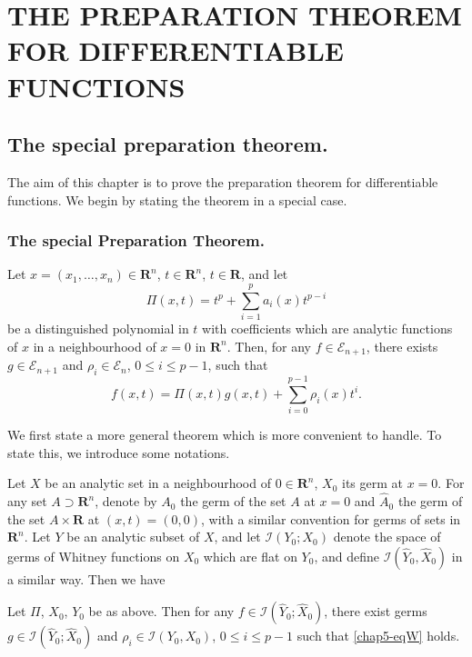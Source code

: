 \chapter{THE PREPARATION THEOREM FOR DIFFERENTIABLE FUNCTIONS}\label{chap5}
\pageoriginale

\section[The special preparation theorem]{The special preparation theorem.}\label{chap5-sec1}
The aim of this chapter is to prove the preparation theorem for differentiable functions. We begin by stating the theorem in a special case.

\subsection{The special Preparation Theorem.}\label{chap5-subsec1.1}
Let $x = (x_1, \ldots, x_n) \in \mathbf{R}^n$, $t \in \mathbf{R}^n$, $t \in \mathbf{R}$, and let
$$
\Pi (x,t) = t^p + \sum\limits^{p}_{i=1} a_i (x) t^{p-i}
$$
be a distinguished polynomial in $t$ with coefficients which are analytic functions of $x$ in a neighbourhood of $x =0$ in $\mathbf{R}^n$. Then, for any $f \in \mathscr{E}_{n+1}$, there exists $g \in \mathscr{E}_{n+1}$ and $\rho_i \in \mathscr{E}_n$, $0 \leq i \leq p -1 $, such that 
\begin{equation*}
f (x,t) = \Pi (x,t) g(x,t) + \sum\limits^{p-1}_{i=0} \rho_i (x)t^i. \tag{W}\label{chap5-eqW}
\end{equation*}

We first state a more general theorem which is more convenient to handle. To state this, we introduce some notations.

Let $X$ be an analytic set in a neighbourhood of $0\in \mathbf{R}^n$, $X_0$ its germ at $x=0$. For any set $A \supset \mathbf{R}^n$, denote by $A_0$ the germ of the set $A$ at $x=0$ and $\widehat{A}_0$ the germ of the set $A \times \mathbf{R}$ at $(x,t) = (0,0)$, with a similar convention for germs of sets in $\mathbf{R}^n$. Let $Y$ be an analytic subset of $X$, and let $\mathscr{I}(Y_0; X_0)$ denote the space of germs of Whitney functions on $X_0$ which are flat on $Y_0$, and define  $\mathscr{I}(\widehat{Y}_0, \widehat{X}_0)$ in a similar way. Then we have

\setcounter{theorem}{1}
\begin{theorem}\label{chap5-thm1.2}%
  Let $\Pi$, $X_0$, $Y_0$ be as above. Then for any $f \in \mathscr{I} (\widehat{Y}_0; \widehat{X}_0)$, there exist germs $g \in \mathscr{I}(\widehat{Y}_0; \widehat{X}_0)$ and $\rho_i \in \mathscr{I} (Y_0, X_0)$, $0\leq i \leq p -1$ such that \eqref{chap5-eqW} holds.
\end{theorem}

